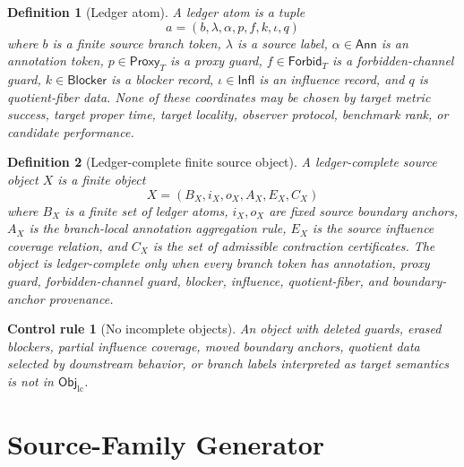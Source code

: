 \documentclass[11pt]{article}
\newcommand{\ObjLC}{\mathsf{Obj}_{\mathrm{lc}}}
\newcommand{\Ann}{\mathsf{Ann}}
\newcommand{\Proxy}{\mathsf{Proxy}_{T}}
\newcommand{\Forbid}{\mathsf{Forbid}_{T}}
\newcommand{\Blocker}{\mathsf{Blocker}}
\newcommand{\Infl}{\mathsf{Infl}}
\newtheorem{definition}{Definition}
\newtheorem{controlrule}{Control rule}
\begin{document}
\begin{definition}[Ledger atom]
A ledger atom is a tuple
\[
    a=(b,\lambda,\alpha,p,f,k,\iota,q)
\]
where \(b\) is a finite source branch token, \(\lambda\) is a source
label, \(\alpha\in\Ann\) is an annotation token, \(p\in\Proxy\) is a
proxy guard, \(f\in\Forbid\) is a forbidden-channel guard,
\(k\in\Blocker\) is a blocker record, \(\iota\in\Infl\) is an influence
record, and \(q\) is quotient-fiber data. None of these coordinates may
be chosen by target metric success, target proper time, target locality,
observer protocol, benchmark rank, or candidate performance.
\end{definition}

\begin{definition}[Ledger-complete finite source object]
A ledger-complete source object \(X\) is a finite object
\[
    X=(B_X,i_X,o_X,A_X,E_X,C_X)
\]
where \(B_X\) is a finite set of ledger atoms, \(i_X,o_X\) are fixed
source boundary anchors, \(A_X\) is the branch-local annotation
aggregation rule, \(E_X\) is the source influence coverage relation, and
\(C_X\) is the set of admissible contraction certificates. The object is
ledger-complete only when every branch token has annotation, proxy guard,
forbidden-channel guard, blocker, influence, quotient-fiber, and
boundary-anchor provenance.
\end{definition}

\begin{controlrule}[No incomplete objects]
An object with deleted guards, erased blockers, partial influence
coverage, moved boundary anchors, quotient data selected by downstream
behavior, or branch labels interpreted as target semantics is not in
\(\ObjLC\).
\end{controlrule}

\section{Source-Family Generator}
\end{document}
